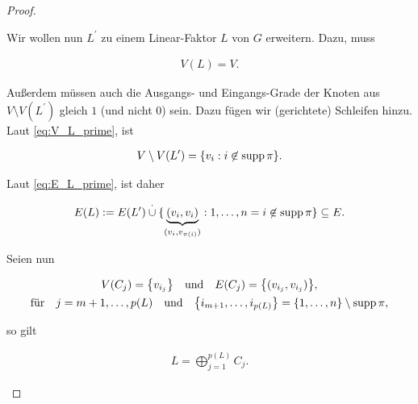 \begin{proof}
\begin{enumerate}[label = \arabic*.]
                    Wir wollen nun $L^\prime$ zu einem Linear-Faktor $L$ von $G$ erweitern.
                    Dazu, muss

                    \begin{align*}
                        V(L) = V.
                    \end{align*}

                    Außerdem müssen auch die Ausgangs- und Eingangs-Grade der Knoten aus $V \setminus V(L^\prime)$ gleich $1$ (und nicht $0$) sein.
                    Dazu fügen wir (gerichtete) Schleifen hinzu.
                    Laut \eqref{eq:V_L_prime}, ist

                    \begin{align*}
                        V \setminus V(L^\prime)
                        =
                        {\left \{ v_i: i \not \in \operatorname{supp} \pi \right \}}.
                    \end{align*}

                    Laut \eqref{eq:E_L_prime}, ist daher

                    \begin{align*}
                        E(L)
                        :=
                        E(L^\prime) \overset{\cdot}{\cup} \{ \underbrace{(v_i, v_i)}_{(v_i, v_{\pi(i)})}: 1, \dots, n = i \not \in \operatorname{supp} \pi \}
                        \subseteq
                        E.
                    \end{align*}

                    Seien nun

                    \begin{gather*}
                        V(C_j) = {\left \{ v_{i_j} \right \}}
                        \quad
                        \text{und}
                        \quad
                        E(C_j) = {\left \{ (v_{i_j}, v_{i_j}) \right \}}, \\
                        \text{für}
                        \quad
                        j = m + 1, \dots, p(L)
                        \quad
                        \text{und}
                        \quad
                        {\left \{ i_{m+1}, \dots, i_{p(L)} \right \}} = {\left \{ 1, \dots, n \right \}} \setminus \operatorname{supp} \pi,
                    \end{gather*}

                    so gilt

                    \begin{align*}
                        L = \bigoplus_{j=1}^{p(L)} C_j.
                    \end{align*}


\end{enumerate}
\end{proof}
